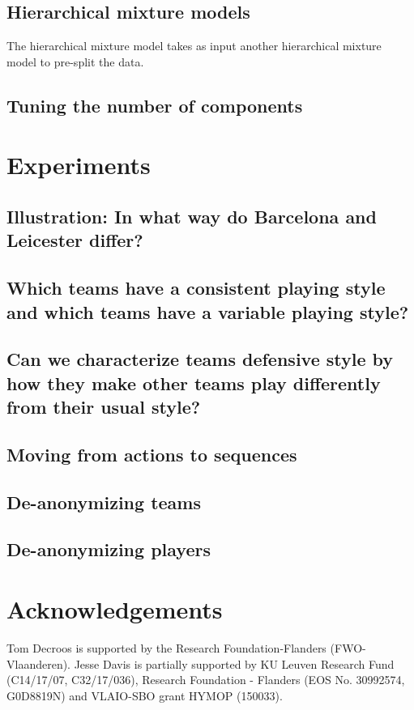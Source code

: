 \documentclass[runningheads]{llncs}
\begin{document}
\subsection{Hierarchical mixture models}
The hierarchical mixture model takes as input another hierarchical mixture model to pre-split the data.

\subsection{Tuning the number of components}

\section{Experiments}
\subsection{Illustration: In what way do Barcelona and Leicester differ?}
\subsection{Which teams have a consistent playing style and which teams have a variable playing style?}
\subsection{Can we characterize teams defensive style by how they make other teams play differently from their usual style?}
\subsection{Moving from actions to sequences}
\subsection{De-anonymizing teams}
\subsection{De-anonymizing players}
\section*{Acknowledgements}
Tom Decroos is supported by the Research Foundation-Flanders
(FWO-Vlaanderen). Jesse Davis is partially supported by KU Leuven Research Fund (C14/17/07, C32/17/036), Research Foundation - Flanders (EOS No. 30992574, G0D8819N) and VLAIO-SBO grant HYMOP (150033).
\end{document}
